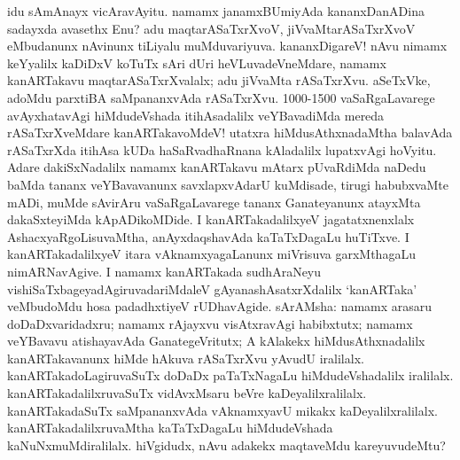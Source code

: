 \documentclass[11pt,a4size]{article}
\begin{document}
idu sAmAnayx vicAravAyitu. namamx janamxBUmiyAda kananxDanADina
sadayxda avasethx Enu? adu maqtarASaTxrXvoV, jiVvaMtarASaTxrXvoV
eMbudanunx nAvinunx tiLiyalu muMduvariyuva. kananxDigareV! nAvu nimamx
keYyalilx kaDiDxV koTuTx sAri dUri heVLuvadeVneMdare, namamx
kanARTakavu maqtarASaTxrXvalalx; adu jiVvaMta rASaTxrXvu. aSeTxVke,
adoMdu parxtiBA saMpananxvAda rASaTxrXvu. 1000-1500 vaSaRgaLavarege
avAyxhatavAgi hiMdudeVshada itihAsadalilx veYBavadiMda mereda
rASaTxrXveMdare kanARTakavoMdeV! utatxra hiMdusAthxnadaMtha balavAda
rASaTxrXda itihAsa kUDa haSaRvadhaRnana kAladalilx lupatxvAgi
hoVyitu. Adare dakiSxNadalilx namamx kanARTakavu mAtarx pUvaRdiMda
naDedu baMda tananx veYBavavanunx savxlapxvAdarU kuMdisade, tirugi
habubxvaMte mADi, muMde sAvirAru vaSaRgaLavarege tananx Ganateyanunx
atayxMta dakaSxteyiMda kApADikoMDide. I kanARTakadalilxyeV
jagatatxnenxlalx AshacxyaRgoLisuvaMtha, anAyxdaqshavAda kaTaTxDagaLu
huTiTxve. I kanARTakadalilxyeV itara vAknamxyagaLanunx miVrisuva
garxMthagaLu nimARNavAgive. I namamx kanARTakada sudhAraNeyu
vishiSaTxbageyadAgiruvadariMdaleV gAyanashAsatxrXdalilx `kanARTaka'
veMbudoMdu hosa padadhxtiyeV rUDhavAgide. sArAMsha: namamx arasaru
doDaDxvaridadxru; namamx rAjayxvu visAtxravAgi habibxtutx; namamx
veYBavavu atishayavAda GanategeVritutx; A kAlakekx hiMdusAthxnadalilx
kanARTakavanunx hiMde hAkuva rASaTxrXvu yAvudU
iralilalx. kanARTakadoLagiruvaSuTx doDaDx paTaTxNagaLu
hiMdudeVshadalilx iralilalx. kanARTakadalilxruvaSuTx vidAvxMsaru beVre
kaDeyalilxralilalx. kanARTakadaSuTx saMpananxvAda vAknamxyavU mikakx
kaDeyalilxralilalx. kanARTakadalilxruvaMtha kaTaTxDagaLu hiMdudeVshada
kaNuNxmuMdiralilalx. hiVgidudx, nAvu adakekx maqtaveMdu kareyuvudeMtu?
\end{document}
